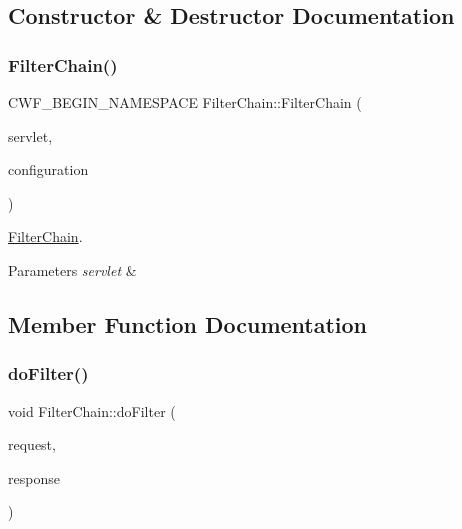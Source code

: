 \subsection{Constructor \& Destructor Documentation}
\mbox{\label{class_filter_chain_aa4e3e6a2aa98f1cb29c3b8eacfe36dde}} 
\subsubsection{\texorpdfstring{Filter\+Chain()}{FilterChain()}}
{\footnotesize\ttfamily C\+W\+F\+\_\+\+B\+E\+G\+I\+N\+\_\+\+N\+A\+M\+E\+S\+P\+A\+CE Filter\+Chain\+::\+Filter\+Chain (\begin{DoxyParamCaption}\item[{\hyperlink{class_http_servlet}{Http\+Servlet} $\ast$}]{servlet,  }\item[{const \hyperlink{class_configuration}{Configuration} \&}]{configuration }\end{DoxyParamCaption})}



\hyperlink{class_filter_chain}{Filter\+Chain}. 


\begin{DoxyParams}{Parameters}
{\em servlet} & \\
\hline
\end{DoxyParams}


\subsection{Member Function Documentation}
\mbox{\label{class_filter_chain_a2792dc5418eeb0914af046d78f679d51}} 
\subsubsection{\texorpdfstring{do\+Filter()}{doFilter()}}
{\footnotesize\ttfamily void Filter\+Chain\+::do\+Filter (\begin{DoxyParamCaption}\item[{C\+W\+F\+::\+Http\+Servlet\+Request \&}]{request,  }\item[{C\+W\+F\+::\+Http\+Servlet\+Response \&}]{response }\end{DoxyParamCaption})}



